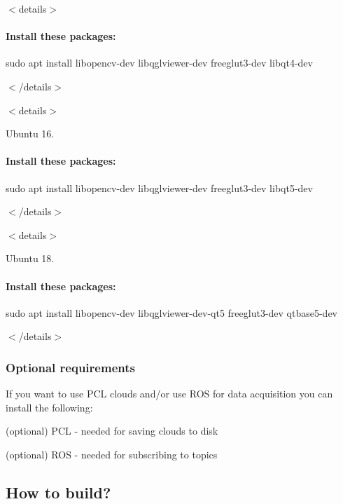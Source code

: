 $<$details$>$

\paragraph*{Install these packages\+:}


\begin{DoxyCode}
sudo apt install libopencv-dev libqglviewer-dev freeglut3-dev libqt4-dev
\end{DoxyCode}
 $<$/details$>$

$<$details$>$ 

Ubuntu 16.

\paragraph*{Install these packages\+:}


\begin{DoxyCode}
sudo apt install libopencv-dev libqglviewer-dev freeglut3-dev libqt5-dev
\end{DoxyCode}
 $<$/details$>$

$<$details$>$ 

Ubuntu 18.

\paragraph*{Install these packages\+:}


\begin{DoxyCode}
sudo apt install libopencv-dev libqglviewer-dev-qt5 freeglut3-dev qtbase5-dev 
\end{DoxyCode}
 $<$/details$>$

\subsubsection*{Optional requirements}

If you want to use P\+CL clouds and/or use R\+OS for data acquisition you can install the following\+:
\begin{DoxyItemize}
\item (optional) P\+CL -\/ needed for saving clouds to disk
\item (optional) R\+OS -\/ needed for subscribing to topics
\end{DoxyItemize}

\subsection*{How to build?}

